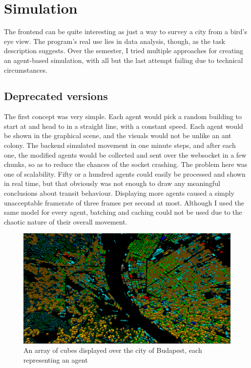 \chapter{Simulation}

The frontend can be quite interesting as just a way to survey a city from a bird's eye view. The program's real use lies in data analysis, though, as the task description suggests. Over the semester, I tried multiple approaches for creating an agent-based simulation, with all but the last attempt failing due to technical circumstances.

\section{Deprecated versions}

The first concept was very simple. Each agent would pick a random building to start at and head to in a straight line, with a constant speed. Each agent would be shown in the graphical scene, and the visuals would not be unlike an ant colony. The backend simulated movement in one minute steps, and after each one, the modified agents would be collected and sent over the websocket in a few chunks, so as to reduce the chances of the socket crashing. The problem here was one of scalability. Fifty or a hundred agents could easily be processed and shown in real time, but that obviously was not enough to draw any meaningful conclusions about transit behaviour. Displaying more agents caused a simply unacceptable framerate of three frames per second at most. Although I used the same model for every agent, batching and caching could not be used due to the chaotic nature of their overall movement.
\begin{figure}[h]
    \centering
    \includegraphics[width=140mm, keepaspectratio]{images/overlay_v1.png}
    \caption{An array of cubes displayed over the city of Budapest, each representing an agent\ \label{overlay_v2}}
\end{figure}

